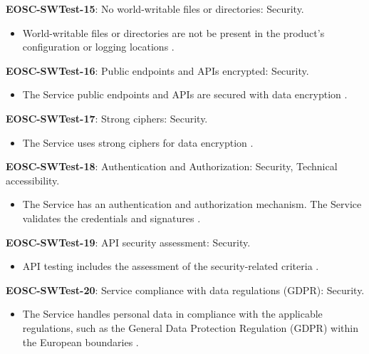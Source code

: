 \textbf{EOSC-SWTest-15}: No world-writable files or directories: Security.

\begin{itemize}
    \item World-writable files or directories are not be present in the product's configuration or logging locations \cite{orviz_set_2017}.
\end{itemize}

\textbf{EOSC-SWTest-16}: Public endpoints and APIs encrypted: Security.

\begin{itemize}
    \item The Service public endpoints and APIs are secured with data encryption \cite{orviz_fernandez_eosc-synergy_2020}.
\end{itemize}

\textbf{EOSC-SWTest-17}: Strong ciphers: Security.

\begin{itemize}
    \item The Service uses strong ciphers for data encryption \cite{orviz_fernandez_eosc-synergy_2020}.
\end{itemize}

\textbf{EOSC-SWTest-18}: Authentication and Authorization: Security, Technical accessibility.

\begin{itemize}
    \item The Service has an authentication and authorization mechanism. The Service validates the credentials and signatures \cite{shepherdson_cessda_2019,orviz_fernandez_eosc-synergy_2020}.
\end{itemize}

\textbf{EOSC-SWTest-19}: API security assessment: Security.

\begin{itemize}
    \item API testing includes the assessment of the security-related criteria \cite{orviz_fernandez_eosc-synergy_2020}.
\end{itemize}

\textbf{EOSC-SWTest-20}: Service compliance with data regulations (GDPR): Security.

\begin{itemize}
    \item The Service handles personal data in compliance with the applicable regulations, such as the General Data Protection Regulation (GDPR) within the European boundaries \cite{orviz_fernandez_eosc-synergy_2020}.
\end{itemize}

